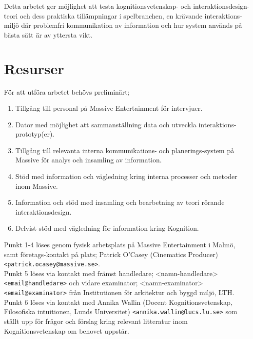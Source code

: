 \documentclass{article}
\begin{document}
  Detta arbetet ger möjlighet att testa kognitionsvetenskap- och
  interaktionsdesign-teori och dess praktiska tillämpningar i spelbranchen,
  en krävande interaktions-miljö där problemfri kommunikation av information och
  hur system används på bästa sätt är av yttersta vikt.

\section*{Resurser}

  För att utföra arbetet behövs preliminärt;
  \begin{enumerate}
    \item{Tillgång till personal på Massive Entertainment för intervjuer.}
    \item{Dator med möjlighet att sammanställning data och utveckla
        interaktions-prototyp(er).}
    \item{Tillgång till relevanta interna kommunikations- och planerings-system
        på Massive för analys och insamling av information.}
    \item{Stöd med information och vägledning kring interna processer och
        metoder inom Massive.}
    \item{Information och stöd med insamling och bearbetning av teori rörande
        interaktionsdesign.}
    \item{Delvist stöd med vägledning för information kring Kognition.}
  \end{enumerate}

  Punkt 1-4 löses genom fysisk arbetsplats på Massive Entertainment i Malmö,
  samt företags-kontakt på plats; Patrick O'Casey (Cinematics Producer) \\
  \texttt{<patrick.ocasey@massive.se>}. \\

  Punkt 5 löses via kontakt med främst handledare; <namn-handledare> \\
  \texttt{<email@handledare>} och vidare examinator; <namn-examinator> \\
  \texttt{<email@examinator>} från Institutionen för arkitektur och byggd
  miljö, LTH. \\

  Punkt 6 löses via kontakt med Annika Wallin (Docent Kognitionsvetenskap,
  Filosofiska intuitionen, Lunds Universitet)
  \texttt{<annika.wallin@lucs.lu.se>} som ställt upp för frågor och förslag
  kring relevant litteratur inom Kognitionsvetenskap om behovet uppstår.



\end{document}
